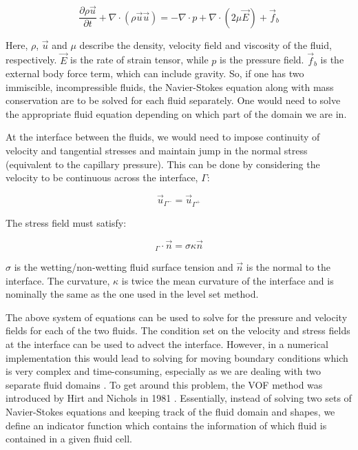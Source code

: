 \begin{equation}
\frac{\partial\rho\vec{u}}{\partial t}+\nabla\cdot(\rho\vec{u}\vec{u}) = -\nabla\cdot p + \nabla\cdot(2\mu\vec{E})+\vec{f}_b
\label{eq:navier_stokes}
\end{equation}

Here, $\rho$, $\vec{u}$ and $\mu$ describe the density, velocity field and viscosity of the fluid, respectively. $\vec{E}$ is the rate of strain tensor, while $p$ is the pressure field. $\vec{f}_b$ is the external body force term, which can include gravity. So, if one has two immiscible, incompressible fluids, the Navier-Stokes equation along with mass conservation are to be solved for each fluid separately. One would need to solve the appropriate fluid equation depending on which part of the domain we are in.

At the interface between the fluids, we would need to impose continuity of velocity and tangential stresses and maintain jump in the normal stress (equivalent to the capillary pressure). This can be done by considering the velocity to be continuous across the interface, $\Gamma$:

\begin{equation}
\vec{u}_{\Gamma^-} = \vec{u}_{\Gamma^+}
\end{equation}

The stress field must satisfy:

\begin{equation}
[-p\vec{I}+2\mu\vec{E}]_{\Gamma}\cdot \vec{n} = \sigma\kappa\vec{n}
\end{equation}

$\sigma$ is the wetting/non-wetting fluid surface tension and $\vec{n}$ is the normal to the interface. The curvature, $\kappa$ is twice the mean curvature of the interface and is nominally the same as the one used in the level set method.

The above system of equations can be used to solve for the pressure and velocity fields for each of the two fluids. The condition set on the velocity and stress fields at the interface can be used to advect the interface. However, in a numerical implementation this would lead to solving for moving boundary conditions which is very complex and time-consuming, especially as we are dealing with two separate fluid domains \cite{ferrari2014inertial}. To get around this problem, the VOF method was introduced by Hirt and Nichols in 1981 \cite{hirt1981volume}. Essentially, instead of solving two sets of Navier-Stokes equations and keeping track of the fluid domain and shapes, we define an indicator function which contains the information of which fluid is contained in a given fluid cell.


